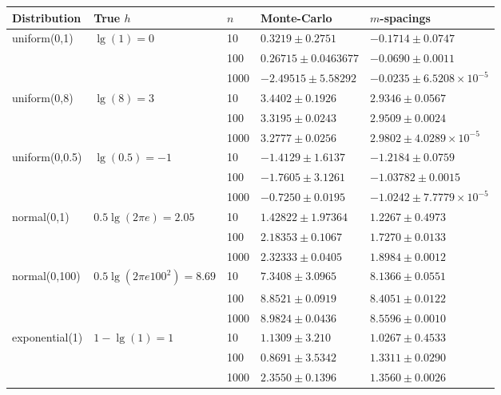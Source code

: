 \documentclass[12pt]{article}
\begin{document}
\begin{center}
\begin{table}
\begin{tabular}{lllll}
{\bf Distribution} & {\bf True $h$ } & {\bf $n$} & {\bf Monte-Carlo } & {\bf $m$-spacings}\\ \hline 
uniform(0,1) & $\lg(1) = 0$ & 10 & $0.3219 \pm 0.2751$ & $-0.1714 \pm 0.0747$ \\
 & & 100 & $0.26715 \pm 0.0463677$ &  $-0.0690 \pm 0.0011$ \\
 & & 1000 & $-2.49515 \pm 5.58292$ &  $-0.0235 \pm 6.5208\times10^{-5}$ \\ 
 
uniform(0,8) & $\lg(8) = 3$ & 10 & $3.4402 \pm 0.1926$ & $2.9346 \pm 0.0567$ \\
 & & 100 & $3.3195 \pm 0.0243$ &  $2.9509 \pm 0.0024$ \\
 & & 1000 & $3.2777 \pm 0.0256$ &  $2.9802 \pm 4.0289\times10^{-5}$ \\ 
 
uniform(0,0.5) & $\lg(0.5) = -1$ & 10 & $-1.4129 \pm 1.6137$ & $-1.2184 \pm 0.0759$ \\
 & & 100 & $-1.7605 \pm 3.1261$ &  $-1.03782 \pm 0.0015$ \\
 & & 1000 & $-0.7250 \pm 0.0195$ &  $-1.0242 \pm 7.7779\times10^{-5}$ \\ 
 
normal(0,1) & $0.5\lg(2\pi e) = 2.05$ & 10 & $1.42822 \pm 1.97364$ & $1.2267 \pm 0.4973$ \\
 & & 100 & $2.18353 \pm 0.1067$ &  $1.7270 \pm 0.0133$ \\
 & & 1000 & $2.32333 \pm 0.0405$ &  $1.8984 \pm 0.0012$ \\ 
 
normal(0,100) & $0.5\lg(2\pi e100^2) = 8.69$ & 10 & $7.3408 \pm 3.0965$ & $8.1366 \pm 0.0551$ \\
 & & 100 & $8.8521 \pm 0.0919$ &  $8.4051 \pm 0.0122$ \\
 & & 1000 & $8.9824 \pm 0.0436$ &  $8.5596 \pm 0.0010 $ \\ 

exponential(1) & $1-\lg(1) = 1$ & 10 & $1.1309 \pm 3.210$ & $1.0267 \pm 0.4533$ \\
 & & 100 & $0.8691 \pm 3.5342$ &  $1.3311 \pm 0.0290$ \\
 & & 1000 & $2.3550 \pm 0.1396$ &  $1.3560 \pm 0.0026 $ \\ 
 

\end{tabular}
\end{table}
\end{center}
\end{document}
